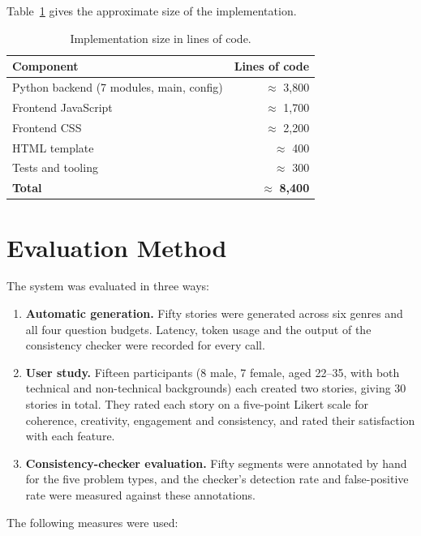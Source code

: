 Table~\ref{tab:loc} gives the approximate size of the implementation.

\begin{table}[H]
\centering
\caption{Implementation size in lines of code.}
\label{tab:loc}
\renewcommand{\arraystretch}{1.2}
\begin{tabular}{|l|r|}
\hline
\textbf{Component} & \textbf{Lines of code} \\
\hline
Python backend (7 modules, main, config) & $\approx$ 3,800 \\
Frontend JavaScript                      & $\approx$ 1,700 \\
Frontend CSS                             & $\approx$ 2,200 \\
HTML template                            & $\approx$ 400 \\
Tests and tooling                        & $\approx$ 300 \\
\hline
\textbf{Total}                           & $\approx$ \textbf{8,400} \\
\hline
\end{tabular}
\end{table}

\section{Evaluation Method}
\label{sec:evalmethod}

The system was evaluated in three ways:

\begin{enumerate}
    \item \textbf{Automatic generation.} Fifty stories were generated across six genres and all four question budgets. Latency, token usage and the output of the consistency checker were recorded for every call.
    \item \textbf{User study.} Fifteen participants (8 male, 7 female, aged 22--35, with both technical and non-technical backgrounds) each created two stories, giving 30 stories in total. They rated each story on a five-point Likert scale for coherence, creativity, engagement and consistency, and rated their satisfaction with each feature.
    \item \textbf{Consistency-checker evaluation.} Fifty segments were annotated by hand for the five problem types, and the checker's detection rate and false-positive rate were measured against these annotations.
\end{enumerate}

The following measures were used:

